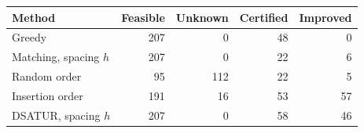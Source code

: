 \begin{tabular}{lrrrr}
\toprule
Method & Feasible & Unknown & Certified & Improved\\\midrule
Greedy & 207 & 0 & 48 & 0\\
Matching, spacing $h$ & 207 & 0 & 22 & 6\\
Random order & 95 & 112 & 22 & 5\\
Insertion order & 191 & 16 & 53 & 57\\
DSATUR, spacing $h$ & 207 & 0 & 58 & 46\\
\bottomrule
\end{tabular}
